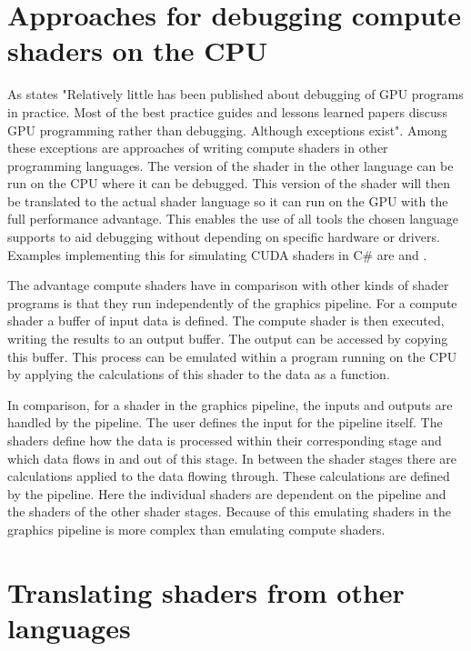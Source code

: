 \section{Approaches for debugging compute shaders on the CPU}
\label{section:computeApproaches}

As  states "Relatively little has been published about debugging of GPU programs  in  practice.  Most  of  the  best  practice  guides  and lessons learned papers discuss GPU programming rather than debugging. Although exceptions exist". Among these exceptions are approaches of writing compute shaders in other programming languages. The version of the shader in the other language can be run on the CPU where it can be debugged. This version of the shader will then be translated to the actual shader language so it can run on the GPU with the full performance advantage. This enables the use of all tools the chosen language supports to aid debugging without depending on specific hardware or drivers.
Examples implementing this for simulating CUDA shaders in C\# are  and .

The advantage compute shaders have in comparison with other kinds of shader programs is that they run independently of the graphics pipeline. For a compute shader a buffer of input data is defined. The compute shader is then executed, writing the results to an output buffer. The output can be accessed by copying this buffer. This process can be emulated within a program running on the CPU by applying the calculations of this shader to the data as a function.

In comparison, for a shader in the graphics pipeline, the inputs and outputs are handled by the pipeline. The user defines the input for the pipeline itself. The shaders define how the data is processed within their corresponding stage and which data flows in and out of this stage. In between the shader stages there are calculations applied to the data flowing through. These calculations are defined by the pipeline. Here the individual shaders are dependent on the pipeline and the shaders of the other shader stages. Because of this emulating shaders in the graphics pipeline is more complex than emulating compute shaders.

\newpage

\section{Translating shaders from other languages}\label{section:translating}

